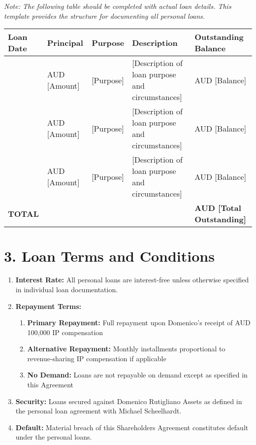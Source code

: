 \textit{Note: The following table should be completed with actual loan details. This template provides the structure for documenting all personal loans.}

\begin{tabularx}{\textwidth}{@{} l l l X l @{}}
\textbf{Loan Date} & \textbf{Principal} & \textbf{Purpose} & \textbf{Description} & \textbf{Outstanding Balance} \\
\hline
[Date] & AUD [Amount] & [Purpose] & [Description of loan purpose and circumstances] & AUD [Balance] \\
\hline
[Date] & AUD [Amount] & [Purpose] & [Description of loan purpose and circumstances] & AUD [Balance] \\
\hline
[Date] & AUD [Amount] & [Purpose] & [Description of loan purpose and circumstances] & AUD [Balance] \\
\hline
\textbf{TOTAL} & & & & \textbf{AUD [Total Outstanding]} \\
\end{tabularx}

\section*{3. Loan Terms and Conditions}

\begin{enumerate}[label=\arabic*.]
\item \textbf{Interest Rate:} All personal loans are interest-free unless otherwise specified in individual loan documentation.

\item \textbf{Repayment Terms:} 
    \begin{enumerate}[label=(\alph*)]
    \item \textbf{Primary Repayment:} Full repayment upon Domenico's receipt of AUD 100,000 IP compensation
    \item \textbf{Alternative Repayment:} Monthly installments proportional to revenue-sharing IP compensation if applicable
    \item \textbf{No Demand:} Loans are not repayable on demand except as specified in this Agreement
    \end{enumerate}

\item \textbf{Security:} Loans secured against Domenico Rutigliano Assets as defined in the personal loan agreement with Michael Scheelhardt.

\item \textbf{Default:} Material breach of this Shareholders Agreement constitutes default under the personal loans.
\end{enumerate}

